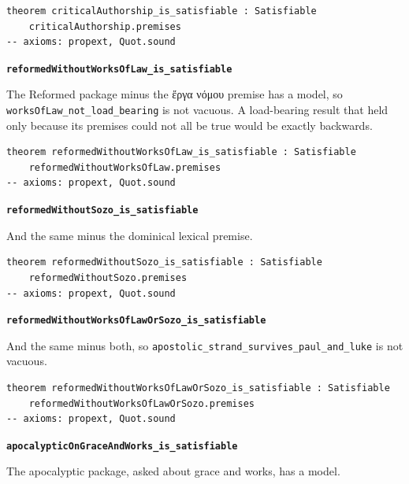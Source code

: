 \documentclass[11pt]{article}
\begin{document}
{\small\begin{verbatim}
theorem criticalAuthorship_is_satisfiable : Satisfiable
    criticalAuthorship.premises
-- axioms: propext, Quot.sound
\end{verbatim}}
\par\medskip\noindent\textbf{\texttt{reformed\allowbreak{}Without\allowbreak{}Works\allowbreak{}Of\allowbreak{}Law\_\allowbreak{}is\_\allowbreak{}satisfiable}}\par\nobreak\noindent
The Reformed package minus the ἔργα νόμου premise has a model, so \texttt{works\allowbreak{}Of\allowbreak{}Law\_\allowbreak{}not\_\allowbreak{}load\_\allowbreak{}bearing} is not vacuous. A load-bearing result that held only because its premises could not all be true would be exactly backwards.

{\small\begin{verbatim}
theorem reformedWithoutWorksOfLaw_is_satisfiable : Satisfiable
    reformedWithoutWorksOfLaw.premises
-- axioms: propext, Quot.sound
\end{verbatim}}
\par\medskip\noindent\textbf{\texttt{reformed\allowbreak{}Without\allowbreak{}Sozo\_\allowbreak{}is\_\allowbreak{}satisfiable}}\par\nobreak\noindent
And the same minus the dominical lexical premise.

{\small\begin{verbatim}
theorem reformedWithoutSozo_is_satisfiable : Satisfiable
    reformedWithoutSozo.premises
-- axioms: propext, Quot.sound
\end{verbatim}}
\par\medskip\noindent\textbf{\texttt{reformed\allowbreak{}Without\allowbreak{}Works\allowbreak{}Of\allowbreak{}Law\allowbreak{}Or\allowbreak{}Sozo\_\allowbreak{}is\_\allowbreak{}satisfiable}}\par\nobreak\noindent
And the same minus both, so \texttt{apostolic\_\allowbreak{}strand\_\allowbreak{}survives\_\allowbreak{}paul\_\allowbreak{}and\_\allowbreak{}luke} is not vacuous.

{\small\begin{verbatim}
theorem reformedWithoutWorksOfLawOrSozo_is_satisfiable : Satisfiable
    reformedWithoutWorksOfLawOrSozo.premises
-- axioms: propext, Quot.sound
\end{verbatim}}
\par\medskip\noindent\textbf{\texttt{apocalyptic\allowbreak{}On\allowbreak{}Grace\allowbreak{}And\allowbreak{}Works\_\allowbreak{}is\_\allowbreak{}satisfiable}}\par\nobreak\noindent
The apocalyptic package, asked about grace and works, has a model.
\end{document}
